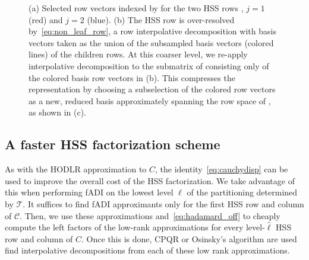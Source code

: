 \documentclass[final,reqno,onefignum,onetabnum]{siamart190516}
\begin{document}
\begin{figure}
\caption{ (a) Selected row vectors indexed by  for the two HSS rows ,  $j = 1$ (red) and $j = 2$ (blue).  (b) The HSS row  is over-resolved by~\eqref{eq:non_leaf_row}, a row interpolative decomposition with  basis vectors taken as the union of the subsampled basis vectors (colored lines) of the children rows.  At this coarser level, we re-apply  interpolative decomposition to the submatrix of  consisting only of the colored basis row vectors in (b). This compresses the representation  by choosing a subselection of the colored row vectors as a new, reduced basis approximately spanning the row space of , as shown in (c).}
\end{figure}


\subsection{A faster HSS factorization scheme}
\label{sec:cauchyhadamard}
As with the HODLR approximation to $C$, the identity~\eqref{eq:cauchydisp} can be used to improve the overall cost of the HSS factorization.  We take advantage of this when performing fADI on the lowest level $\hat \ell$ of the partitioning determined by $\mathcal T$. It suffices to find fADI approximants only for the first HSS row and column of $\mathscr{C}$.  Then, we use these approximations and~\eqref{eq:hadamard_off} to cheaply compute the left factors of the low-rank approximations for every level-$\hat \ell$ HSS row and column of $C$. Once this is done, CPQR or Osinsky's algorithm are used find interpolative decompositions from each of these low rank approximations. 
\end{document}
